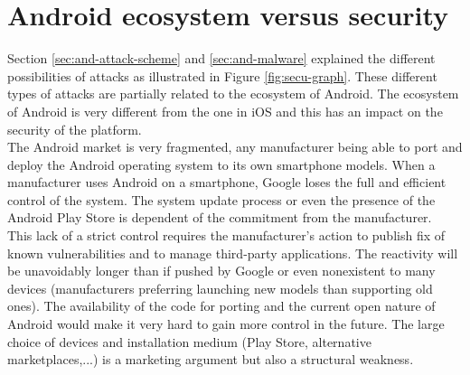 \section{Android ecosystem versus security}
\label{sec:and-echosystem}

Section \ref{sec:and-attack-scheme} and \ref{sec:and-malware} explained the different possibilities of attacks as illustrated in Figure \ref{fig:secu-graph}.
These different types of attacks are partially related to the ecosystem of Android.
The ecosystem of Android is very different from the one in iOS and this has an impact on the security of the platform.\\

The Android market is very fragmented, any manufacturer being able to port and deploy the Android operating system to its own smartphone models.
When a manufacturer uses Android on a smartphone, Google loses the full and efficient control of the system.
The system update process or even the presence of the Android Play Store is dependent of the commitment from the manufacturer.\\

This lack of a strict control requires  the manufacturer's action to publish fix of known vulnerabilities and to manage third-party applications.
The reactivity will be unavoidably longer than if pushed by Google or even nonexistent to many devices (manufacturers preferring launching new models than supporting old ones).
The availability of the code for porting and the current open nature of Android would make it very hard to gain more control in the future.
The large choice of devices and installation medium (Play Store, alternative marketplaces,...) is a marketing argument but also a structural weakness.
